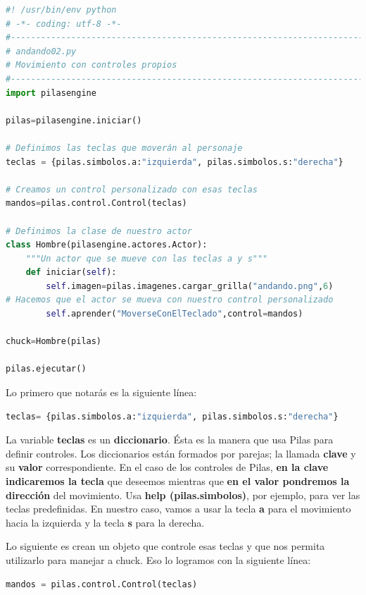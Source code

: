 \documentclass{article}
\begin{document}
\begin{lstlisting}[language=Python]
#! /usr/bin/env python
# -*- coding: utf-8 -*-
#-----------------------------------------------------------------------
# andando02.py
# Movimiento con controles propios
#-----------------------------------------------------------------------
import pilasengine

pilas=pilasengine.iniciar()

# Definimos las teclas que moverán al personaje
teclas = {pilas.simbolos.a:"izquierda", pilas.simbolos.s:"derecha"}

# Creamos un control personalizado con esas teclas
mandos=pilas.control.Control(teclas)

# Definimos la clase de nuestro actor
class Hombre(pilasengine.actores.Actor):
    """Un actor que se mueve con las teclas a y s"""
    def iniciar(self):
        self.imagen=pilas.imagenes.cargar_grilla("andando.png",6)
# Hacemos que el actor se mueva con nuestro control personalizado
        self.aprender("MoverseConElTeclado",control=mandos)
        
chuck=Hombre(pilas)

pilas.ejecutar()

\end{lstlisting}

\vspace{\baselineskip}
Lo primero que notarás es la siguiente línea:
\begin{lstlisting}[language=Python]
teclas= {pilas.simbolos.a:"izquierda", pilas.simbolos.s:"derecha"}
\end{lstlisting}
\vspace{\baselineskip}

La variable \textbf{teclas} es un \textbf{diccionario}. Ésta es la manera que usa Pilas para definir controles. Los diccionarios están formados por parejas; la llamada \textbf{clave} y su \textbf{valor} correspondiente. En el caso de los controles de Pilas, \textbf{en la clave indicaremos la tecla} que deseemos mientras que \textbf{en el valor pondremos la dirección} del movimiento. Usa \textbf{help (pilas.simbolos)}, por ejemplo, para ver las teclas predefinidas. En nuestro caso, vamos a usar la tecla \textbf{a} para el movimiento hacia la izquierda y la tecla \textbf{s} para la derecha.\par
Lo siguiente es crean un objeto que controle esas teclas y que nos permita utilizarlo para manejar a chuck. Eso lo logramos con la siguiente línea:
\begin{lstlisting}[language=Python]
mandos = pilas.control.Control(teclas)
\end{lstlisting}
\vspace{\baselineskip}
\end{document}
